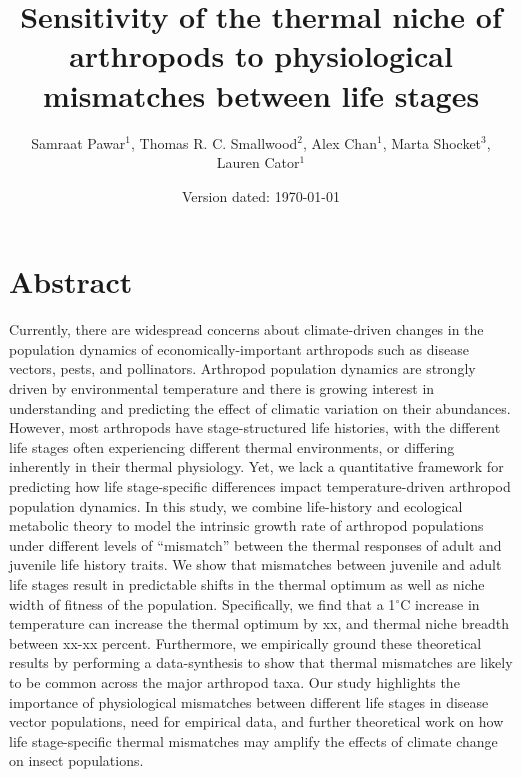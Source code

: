 

\title{Sensitivity of the thermal niche of arthropods to physiological mismatches between life stages}

\author{Samraat Pawar$^1$, Thomas R. C. Smallwood$^2$, Alex Chan$^1$, Marta Shocket$^3$, Lauren Cator$^1$}


\date{Version dated: \today}




\maketitle


\section*{Abstract}

Currently, there are widespread concerns about climate-driven changes in the population dynamics of economically-important arthropods such as disease vectors, pests, and pollinators. Arthropod population dynamics are strongly driven by environmental temperature and there is growing interest in understanding and predicting the effect of climatic variation on their abundances. However, most arthropods have stage-structured life histories, with the different life stages often experiencing different thermal environments, or differing inherently in their thermal physiology. Yet, we lack a quantitative framework for predicting how life stage-specific differences impact temperature-driven arthropod population dynamics. In this study, we combine life-history and ecological metabolic theory to model the intrinsic growth rate of arthropod populations under different levels of ``mismatch'' between the thermal responses of adult and juvenile life history traits. We show that mismatches between juvenile and adult life stages result in predictable shifts in the thermal optimum as well as niche width of fitness of the population. Specifically, we find that a 1$^\circ$C increase in temperature can increase the thermal optimum by xx, and thermal niche breadth between xx-xx percent. Furthermore, we empirically ground these theoretical results by performing a data-synthesis to show that thermal mismatches are likely to be common across the major arthropod taxa. Our study highlights the importance of physiological mismatches between different life stages in disease vector populations, need for empirical data, and further theoretical work on how life stage-specific thermal mismatches may amplify the effects of climate change on insect populations.

